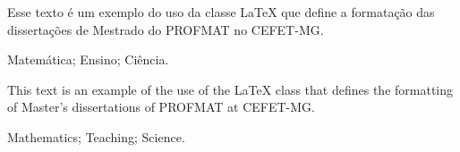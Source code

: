 \begin{Resumo}

Esse texto é um exemplo do uso da classe \LaTeX{}
que define a formatação das dissertações de Mestrado do
PROFMAT no CEFET-MG.

\PalavrasChave Matemática; Ensino; Ciência.

\end{Resumo}

\begin{Abstract}

This text is an example of the use of the \LaTeX{} class
that defines the formatting of Master's dissertations of
PROFMAT at CEFET-MG.

\Keywords Mathematics; Teaching; Science.

\end{Abstract}




\tableofcontents